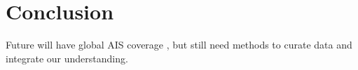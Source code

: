 \section{Conclusion}



Future will have global AIS coverage \cite{JonesGoogle2012,carson2012satellite}, but still need methods to curate data and integrate our understanding.
